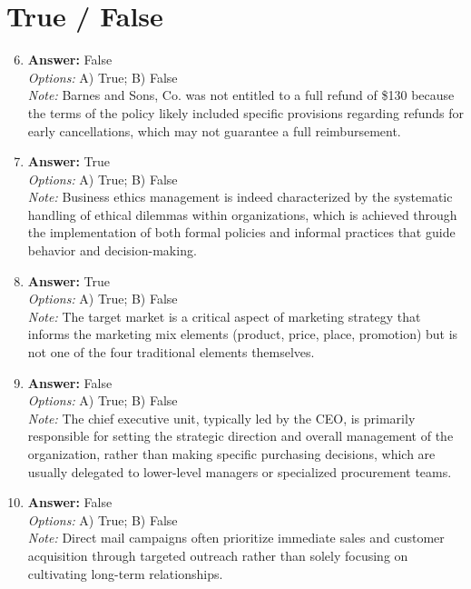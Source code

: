 \documentclass[12pt]{article}
\begin{document}
\section*{True / False}
\begin{enumerate}[label=\arabic*.]
\setcounter{enumi}{5}
\item \textbf{Answer:} False
\\ \textit{Options:} A) True; B) False
\\ \textit{Note:} Barnes and Sons, Co. was not entitled to a full refund of \$130 because the terms of the policy likely included specific provisions regarding refunds for early cancellations, which may not guarantee a full reimbursement.
\item \textbf{Answer:} True
\\ \textit{Options:} A) True; B) False
\\ \textit{Note:} Business ethics management is indeed characterized by the systematic handling of ethical dilemmas within organizations, which is achieved through the implementation of both formal policies and informal practices that guide behavior and decision-making.
\item \textbf{Answer:} True
\\ \textit{Options:} A) True; B) False
\\ \textit{Note:} The target market is a critical aspect of marketing strategy that informs the marketing mix elements (product, price, place, promotion) but is not one of the four traditional elements themselves.
\item \textbf{Answer:} False
\\ \textit{Options:} A) True; B) False
\\ \textit{Note:} The chief executive unit, typically led by the CEO, is primarily responsible for setting the strategic direction and overall management of the organization, rather than making specific purchasing decisions, which are usually delegated to lower-level managers or specialized procurement teams.
\item \textbf{Answer:} False
\\ \textit{Options:} A) True; B) False
\\ \textit{Note:} Direct mail campaigns often prioritize immediate sales and customer acquisition through targeted outreach rather than solely focusing on cultivating long-term relationships.
\end{enumerate}
\end{document}

